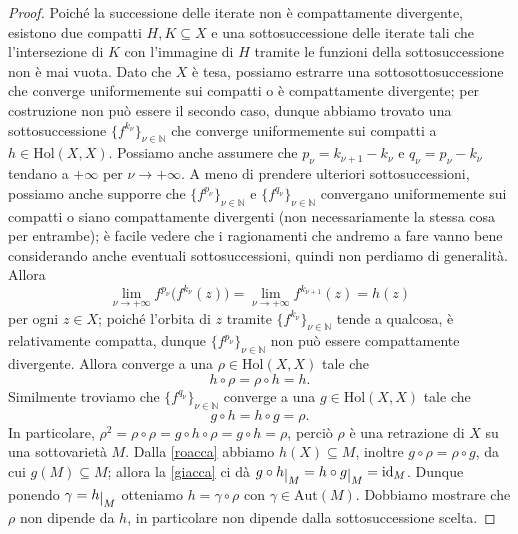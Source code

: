 \begin{proof}
    Poiché la successione delle iterate non è compattamente divergente, esistono due compatti $H,K\subseteq X$ e una sottosuccessione delle iterate tali che l'intersezione di $K$ con l'immagine di $H$ tramite le funzioni della sottosuccessione non è mai vuota. Dato che $X$ è tesa, possiamo estrarre una sottosottosuccessione che converge uniformemente sui compatti o è compattamente divergente; per costruzione non può essere il secondo caso, dunque abbiamo trovato una sottosuccessione $\{f^{k_{\nu}}\}_{\nu\in\mathbb{N}}$ che converge uniformemente sui compatti a $h\in\text{Hol}(X,X)$. Possiamo anche assumere che $p_\nu=k_{\nu+1}-k_\nu$ e $q_\nu=p_\nu-k_\nu$ tendano a $+\infty$ per $\nu\longrightarrow+\infty$. A meno di prendere ulteriori sottosuccessioni, possiamo anche supporre che $\{f^{p_\nu}\}_{\nu\in\mathbb{N}}$ e $\{f^{q_\nu}\}_{\nu\in\mathbb{N}}$ convergano uniformemente sui compatti o siano compattamente divergenti (non necessariamente la stessa cosa per entrambe); è facile vedere che i ragionamenti che andremo a fare vanno bene considerando anche eventuali sottosuccessioni, quindi non perdiamo di generalità. Allora
    $$\lim_{\nu\longrightarrow+\infty}f^{p_\nu}\big(f^{k_\nu}(z)\big)=\lim_{\nu\longrightarrow+\infty}f^{k_{\nu+1}}(z)=h(z)$$
    per ogni $z \in X$; poiché l'orbita di $z$ tramite $\{f^{k_\nu}\}_{\nu\in\mathbb{N}}$ tende a qualcosa, è relativamente compatta, dunque $\{f^{p_\nu}\}_{\nu\in\mathbb{N}}$ non può essere compattamente divergente. Allora converge a una $\rho\in\text{Hol}(X,X)$ tale che
    \begin{equation} \label{roacca}
        h\circ\rho=\rho\circ h=h.
    \end{equation}
    Similmente troviamo che $\{f^{q_\nu}\}_{\nu\in\mathbb{N}}$ converge a una $g\in\text{Hol}(X,X)$ tale che
    \begin{equation} \label{giacca}
        g\circ h=h\circ g=\rho.
    \end{equation}
    In particolare, $\rho^2=\rho\circ\rho=g\circ h\circ\rho=g\circ h=\rho$, perciò $\rho$ è una retrazione di $X$ su una sottovarietà $M$. Dalla \eqref{roacca} abbiamo $h(X)\subseteq M$, inoltre $g\circ\rho=\rho\circ g$, da cui $g(M)\subseteq M$; allora la \eqref{giacca} ci dà $g\circ h\restrict{M}=h\circ g\restrict{M}=\id_M$. Dunque ponendo $\gamma=h\restrict{M}$ otteniamo $h=\gamma\circ\rho$ con $\gamma\in\text{Aut}(M)$. Dobbiamo mostrare che $\rho$ non dipende da $h$, in particolare non dipende dalla sottosuccessione scelta.


\end{proof}
